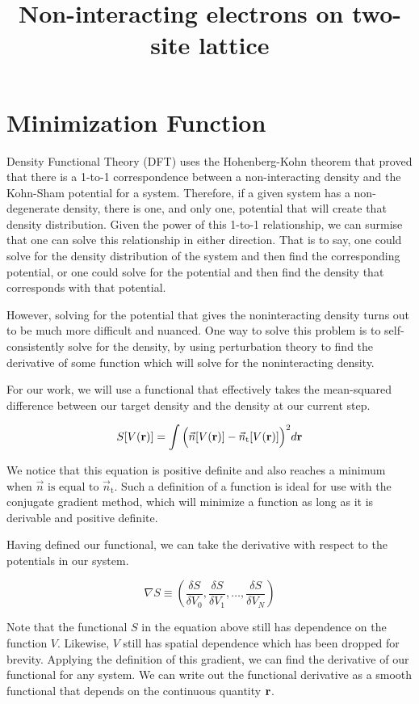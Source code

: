 \documentclass[10pt]{revtex4-1}
\newcommand{\bfr}{{\bf r}}
\begin{document}
\title{Non-interacting electrons on two-site lattice}

\section{Minimization Function}

Density Functional Theory (DFT) uses the Hohenberg-Kohn theorem that proved that there is a 1-to-1 correspondence between a non-interacting density and the Kohn-Sham potential for a system.
Therefore, if a given system has a non-degenerate density, there is one, and only one, potential that will create that density distribution.
Given the power of this 1-to-1 relationship, we can surmise that one can solve this relationship in either direction.
That is to say, one could solve for the density distribution of the system and then find the corresponding potential, or one could solve for the potential and then find the density that corresponds with that potential.

However, solving for the potential that gives the noninteracting density turns out to be much more difficult and nuanced.
One way to solve this problem is to self-consistently solve for the density, by using perturbation theory to find the derivative of some function which will solve for the noninteracting density.

For our work, we will use a functional that effectively takes the mean-squared difference between our target density and the density at our current step.

\begin{equation}
  S[V(\bfr)] = \int \Big (\vec{n}[V(\bfr)] - \vec{n}_{\text{t}}[V(\bfr)]\Big)^2 d\bfr
\end{equation}

We notice that this equation is positive definite and also reaches a minimum when $\vec{n} \text{ is equal to } \vec{n}_{\text{t}}$.
Such a definition of a function is ideal for use with the conjugate gradient method, which will minimize a function as long as it is derivable and positive definite.

Having defined our functional, we can take the derivative with respect to the potentials in our system.

\begin{equation}
  \nabla S \equiv \left(\frac{\delta S}{\delta V_0},\frac{\delta S}{\delta V_1},\dots,\frac{\delta S}{\delta V_N}\right)
\end{equation}

Note that the functional $S$ in the equation above still has dependence on the function $V$.
Likewise, $V$ still has spatial dependence which has been dropped for brevity.
Applying the definition of this gradient, we can find the derivative of our functional for any system.
We can write out the functional derivative as a smooth functional that depends on the continuous quantity $\bfr$.
\end{document}

